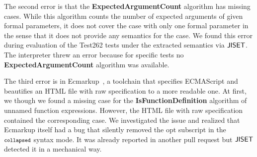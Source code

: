 The second error is that the \textbf{ExpectedArgumentCount} algorithm
has missing cases.  While this algorithm counts
the number of expected arguments of given formal parameters, it does
not cover the case with only one formal parameter in the sense that it
does not provide any semantics for the case.  We found this error
during evaluation of the Test262 tests under the extracted semantics
via \( \text{\sf JISET} \).  The interpreter threw an error because for specific
tests no \textbf{ExpectedArgumentCount} algorithm was available.

The third error is in \textsf{Ecmarkup}~\cite{ecmarkup}, a
toolchain that specifies ECMAScript and beautifies an HTML file with
raw specification to a more readable one.  At first, we though we
found a missing case for the \textbf{IsFunctionDefinition} algorithm
of unnamed function expressions.  However, the HTML file with raw
specification contained the corresponding case.  We investigated the
issue and realized that \textsf{Ecmarkup} itself had a bug that
silently removed the {\small opt} subscript in the \( \texttt{\footnotesize collapsed} \)
syntax mode.  It was already reported in another pull request but
\( \text{\sf JISET} \) detected it in a mechanical way.
